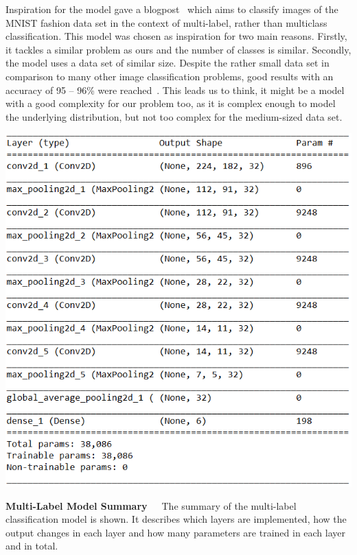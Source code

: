 \bigskip
Inspiration for the model gave a blogpost~\citep{blogpostMulti} which aims to classify images of the MNIST fashion data set in the context of multi-label, rather than multiclass classification.
This model was chosen as inspiration for two main reasons. Firstly, it tackles a similar problem as ours and the number of classes is similar. Secondly, the model uses a data set of similar size. Despite the rather small data set in comparison to many other image classification problems, good results with an accuracy of 95 -- 96\% were reached~\citep{blogpostMulti}. This leads us to think, it might be a model with a good complexity for our problem too, as it is complex enough to model the underlying distribution, but not too complex for the medium-sized data set.

\begin{table}[!htb]
    \centering
    \includegraphics[scale=0.8]{Figures/chapter04/multilabel_structure.png}
    \decoRule
    \caption[Multi-Label Model Summary]{\textbf{Multi-Label Model Summary}~~~The summary of the multi-label classification model is shown. It describes which layers are implemented, how the output changes in each layer and how many parameters are trained in each layer and in total.}
    \label{tab:MultilabelStructure}
\end{table}

